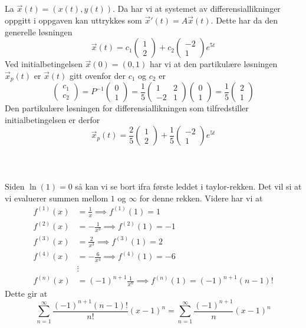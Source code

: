 \documentclass[12pt, a4paper,norsk]{article}
\newcommand{\oppgave}{\,\section{}}
\newcommand{\deloppgave}{\subsection{}}
\newcommand{\inverse}{^{-1}}
\begin{document}
	\deloppgave
	La $\vec{x}(t) = (x(t), y(t))$. Da har vi at systemet av differensiallikninger oppgitt i oppgaven kan uttrykkes som $\vec{x}'(t) = A\vec{x}(t)$. Dette har da den generelle løsningen
	$$
	\vec{x}(t) = c_1\begin{pmatrix}
		1\\2
	\end{pmatrix} + c_2\begin{pmatrix}
	-2\\1
	\end{pmatrix}e^{5t}
	$$
	Ved initialbetingelsen $\vec{x}(0) = (0, 1)$ har vi at den partikulære løsningen $\vec{x}_p(t)$ er $\vec{x}(t)$ gitt ovenfor der $c_1$ og $c_2$ er
	$$
	\begin{pmatrix}
		c_1\\c_2
	\end{pmatrix}
	= P\inverse \begin{pmatrix}
		0\\1
	\end{pmatrix} = \frac{1}{5}\begin{pmatrix}
	1 & 2\\
	-2 & 1
	\end{pmatrix}\begin{pmatrix}
	0\\1
	\end{pmatrix} = \frac{1}{5}\begin{pmatrix}
	2\\1
	\end{pmatrix}
	$$
	Den partikulære løsningen for differensiallikningen som tilfredstiller initialbetingelsen er derfor
	$$
	\vec{x}_p(t) = \frac{2}{5}\begin{pmatrix}
		1\\2
	\end{pmatrix} + \frac{1}{5}\begin{pmatrix}
		-2\\1
	\end{pmatrix}e^{5t}
	$$
	\clearpage
	\oppgave
	\deloppgave
	Siden $\ln(1) = 0$ så kan vi se bort ifra første leddet i taylor-rekken. Det vil si at vi evaluerer summen mellom $1$ og $\infty$ for denne rekken. Videre har vi at
	\begin{align*}
		f^{(1)}(x) &= \frac{1}{x} \implies f^{(1)}(1) = 1\\
		f^{(2)}(x) &= -\frac{1}{x^2} \implies f^{(2)}(1) = -1\\
		f^{(3)}(x) &= \frac{2}{x^3} \implies f^{(3)}(1) = 2\\
		f^{(4)}(x) &= -\frac{6}{x^4} \implies f^{(4)}(1) = -6\\
		&\vdots\\
		f^{(n)}(x) &= \left(-1\right)^{n+1}\frac{1}{x^{n}} \implies f^{(n)}(1) = \left(-1\right)^{n+1}(n-1)!
	\end{align*}
	Dette gir at
	$$
	\sum_{n = 1}^\infty \frac{\left(-1\right)^{n+1}(n-1)!}{n!}(x-1)^n = \sum_{n = 1}^\infty \frac{\left(-1\right)^{n+1}}{n}(x-1)^n
	$$
	
\end{document}
